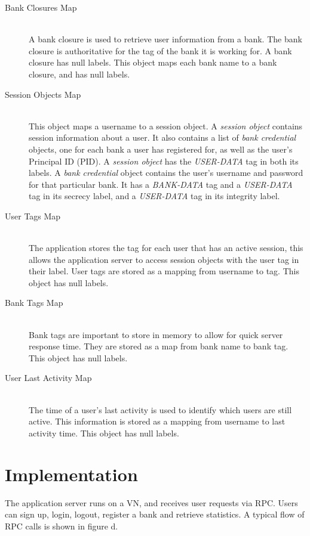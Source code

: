 \begin{description}
  \item[Bank Closures Map] \ \\
    A bank closure is used to retrieve user
    information from a bank. The bank closure
    is authoritative for the tag of the bank
    it is working for. A bank closure has null
    labels.
    This object maps each bank name 
    to a bank closure, and has null labels.
  \item[Session Objects Map] \ \\
    This object maps a username to a session 
    object.
    A \emph{session object} contains session 
    information about a user. It also contains
    a list of \emph{bank credential} objects,
    one for each bank a user has registered 
    for, as well as the user's Principal ID
    (PID). 
    A \emph{session object} has the 
    \emph{USER-DATA} tag in both its labels.
    A \emph{bank credential} object contains 
    the user's username and password for that
    particular bank. It has a \emph{BANK-DATA}
    tag and a \emph{USER-DATA} tag in its 
    secrecy label, and a \emph{USER-DATA} tag
    in its integrity label.
  \item[User Tags Map] \ \\
    The application stores the tag for each user 
    that has an active session, this allows the 
    application server to access session objects 
    with the user tag in their label. User tags 
    are stored as a mapping from username to tag.
    This object has null labels.
  \item[Bank Tags Map] \ \\
    Bank tags are important to store in memory to 
    allow for quick server response time. They are 
    stored as a map from bank name to bank tag.
    This object has null labels.
  \item[User Last Activity Map] \ \\
    The time of a user's last activity 
    is used to identify which users
    are still active. This information is stored 
    as a mapping from username to last activity 
    time.
    This object has null labels.
\end{description}

\section{Implementation}
\label{mint:impl}

The application server runs on a VN, and receives user requests via RPC. Users can sign up, login, logout, register a bank and retrieve statistics. A typical flow of RPC calls is shown in figure d. 

